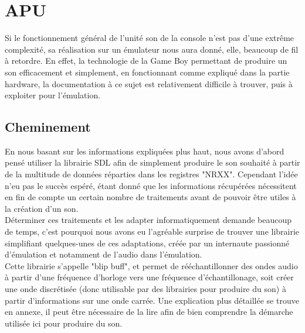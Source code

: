 \documentclass[french]{report}
\begin{document}
\section{APU}
	Si le fonctionnement général de l'unité son de la console n'est pas d'une extrême complexité, sa réalisation sur un émulateur nous aura donné, elle, beaucoup de fil à retordre.
	En effet, la technologie de la Game Boy permettant de produire un son efficacement et simplement, en fonctionnant comme expliqué dans la partie hardware, la documentation à ce sujet est relativement difficile à trouver, puis à exploiter pour l'émulation.\\
\subsection{Cheminement}
	En nous basant sur les informations expliquées plus haut, nous avons d'abord pensé utiliser la librairie SDL afin de simplement produire le son souhaité à partir de la multitude de données réparties dans les registres "NRXX". Cependant l'idée n'eu pas le succès espéré, étant donné que les informations récupérées nécessitent en fin de compte un certain nombre de traitements avant de pouvoir être utiles à la création d'un son.\\
	Déterminer ces traitements et les adapter informatiquement demande beaucoup de temps, c'est pourquoi nous avons eu l'agréable surprise de trouver une librairie simplifiant quelques-unes de ces adaptations, créée par un internaute passionné d'émulation et notamment de l'audio dans l'émulation.\\
	Cette librairie s'appelle "blip buff", et permet de rééchantillonner des ondes audio à partir d'une fréquence d'horloge vers une fréquence d'échantillonage, soit créer une onde discrétisée (donc utilisable par des librairies pour produire du son) à partir d'informations sur une onde carrée. 
	Une explication plus détaillée se trouve en annexe, il peut être nécessaire de la lire afin de bien comprendre la démarche utilisée ici pour produire du son.
\end{document}
